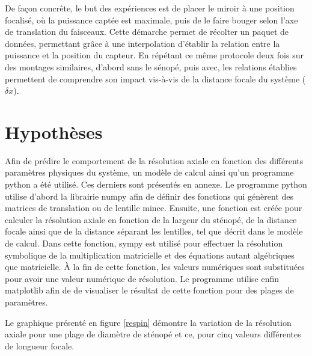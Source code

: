 \documentclass[11pt,letterpaper]{article}
\begin{document}
De façon concrête, le but des expériences est de placer le miroir à une position focalisé, où la puissance captée est maximale, puis de le faire bouger selon l'axe de translation du faisceaux. Cette démarche permet de récolter un paquet de données, permettant grâce à une interpolation d'établir la relation entre la puissance et la position du capteur. En répétant ce même protocole deux fois sur des montages similaires, d'abord sans le sénopé, puis avec, les relations établies permettent de comprendre son impact vis-à-vis de la distance focale du système ($\delta x$). 

\section{Hypothèses}

Afin de prédire le comportement de la résolution axiale en fonction des différents paramètres physiques du système, un modèle de calcul ainsi qu'un programme python a été utilisé. Ces derniers sont présentés en annexe. Le programme python utilise d'abord la librairie numpy afin de définir des fonctions qui génèrent des matrices de translation ou de lentille mince. Ensuite, une fonction est créée pour calculer la résolution axiale en fonction de la largeur du sténopé, de la distance focale ainsi que de la distance séparant les lentilles, tel que décrit dans le modèle de calcul. Dans cette fonction, sympy est utilisé pour effectuer la résolution symbolique de la multiplication matricielle et des équations autant algébriques que matricielle. À la fin de cette fonction, les valeurs numériques sont substituées pour avoir une valeur numérique de résolution. Le programme utilise enfin matplotlib afin de de visualiser le résultat de cette fonction pour des plages de paramètres.

Le graphique présenté en figure \ref{respin} démontre la variation de la résolution axiale pour une plage de diamètre de sténopé et ce, pour cinq valeurs différentes de longueur focale.
\end{document}
